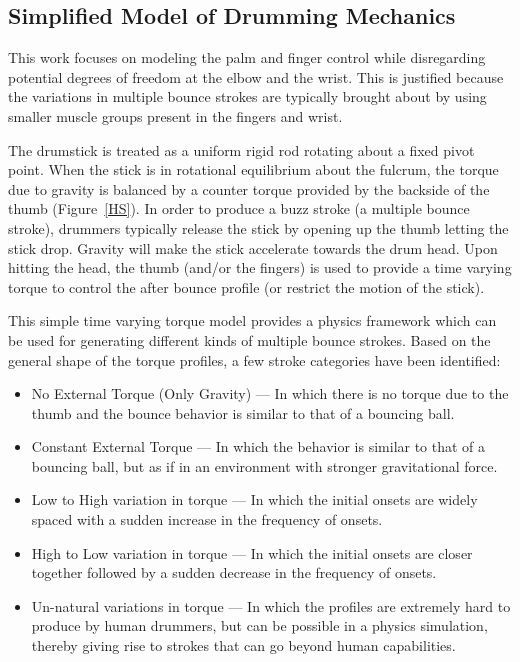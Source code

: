 \documentclass[final,1p,times]{elsarticle}
\begin{document}
\subsection{Simplified Model of Drumming Mechanics}

This work focuses on modeling the palm and finger
control while disregarding potential degrees of freedom at the elbow and the wrist. This is justified because the variations in multiple bounce strokes are typically brought about by using smaller muscle groups present in the fingers and wrist. 

The drumstick is treated as a uniform rigid rod rotating about a fixed pivot point. When the stick is in rotational equilibrium about the fulcrum, the torque due to gravity is balanced by a counter torque provided by the backside of the thumb (Figure~\ref{HS}). In order to produce a buzz stroke (a multiple bounce stroke), drummers typically release the stick by opening up the thumb letting the stick drop. Gravity will make the stick accelerate towards the drum head. Upon hitting the head, the thumb (and/or the fingers) is used to provide a time varying torque to control the after bounce profile (or restrict the motion of the stick).

This simple time varying torque model provides a physics framework
which can be used for generating different kinds of multiple bounce strokes. Based on the general shape of the torque profiles, a few stroke categories have been identified:
\begin{itemize}
	\item No External Torque (Only Gravity) --- In which there is no torque due to the thumb and the bounce behavior is similar to that of a bouncing ball.
	\item Constant External Torque --- In which the behavior is similar to that of a bouncing ball, but as if in an environment with stronger gravitational force. 
	\item Low to High variation in torque --- In which the initial onsets are widely spaced with a sudden increase in the frequency of onsets. 
	\item High to Low variation in torque --- In which the initial onsets are closer together followed by a sudden decrease in the frequency of onsets.
	\item Un-natural variations in torque --- In which the profiles are extremely hard to produce by human drummers, but can be possible in a physics simulation, thereby giving rise to strokes that can go beyond human capabilities.
\end{itemize}
\end{document}
